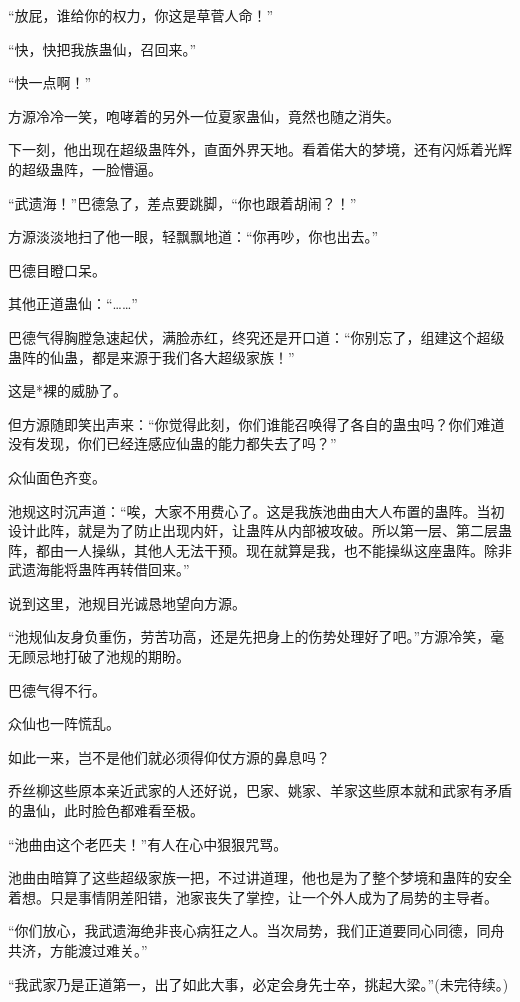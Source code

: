 \begin{this_body}
“放屁，谁给你的权力，你这是草菅人命！”

“快，快把我族蛊仙，召回来。”

“快一点啊！”

方源冷冷一笑，咆哮着的另外一位夏家蛊仙，竟然也随之消失。

下一刻，他出现在超级蛊阵外，直面外界天地。看着偌大的梦境，还有闪烁着光辉的超级蛊阵，一脸懵逼。

“武遗海！”巴德急了，差点要跳脚，“你也跟着胡闹？！”

方源淡淡地扫了他一眼，轻飘飘地道：“你再吵，你也出去。”

巴德目瞪口呆。

其他正道蛊仙：“……”

巴德气得胸膛急速起伏，满脸赤红，终究还是开口道：“你别忘了，组建这个超级蛊阵的仙蛊，都是来源于我们各大超级家族！”

这是*裸的威胁了。

但方源随即笑出声来：“你觉得此刻，你们谁能召唤得了各自的蛊虫吗？你们难道没有发现，你们已经连感应仙蛊的能力都失去了吗？”

众仙面色齐变。

池规这时沉声道：“唉，大家不用费心了。这是我族池曲由大人布置的蛊阵。当初设计此阵，就是为了防止出现内奸，让蛊阵从内部被攻破。所以第一层、第二层蛊阵，都由一人操纵，其他人无法干预。现在就算是我，也不能操纵这座蛊阵。除非武遗海能将蛊阵再转借回来。”

说到这里，池规目光诚恳地望向方源。

“池规仙友身负重伤，劳苦功高，还是先把身上的伤势处理好了吧。”方源冷笑，毫无顾忌地打破了池规的期盼。

巴德气得不行。

众仙也一阵慌乱。

如此一来，岂不是他们就必须得仰仗方源的鼻息吗？

乔丝柳这些原本亲近武家的人还好说，巴家、姚家、羊家这些原本就和武家有矛盾的蛊仙，此时脸色都难看至极。

“池曲由这个老匹夫！”有人在心中狠狠咒骂。

池曲由暗算了这些超级家族一把，不过讲道理，他也是为了整个梦境和蛊阵的安全着想。只是事情阴差阳错，池家丧失了掌控，让一个外人成为了局势的主导者。

“你们放心，我武遗海绝非丧心病狂之人。当次局势，我们正道要同心同德，同舟共济，方能渡过难关。”

“我武家乃是正道第一，出了如此大事，必定会身先士卒，挑起大梁。”(未完待续。)

\end{this_body}

